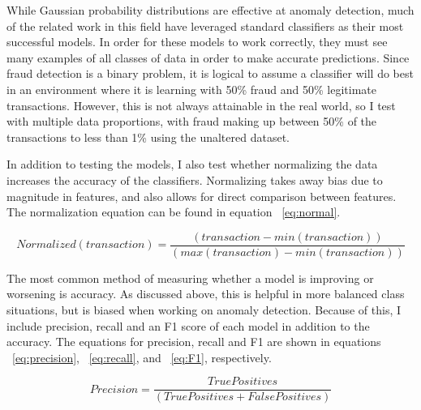 \documentclass[midd]{thesis}
\begin{document}

 While Gaussian probability distributions are effective at anomaly detection, much of the related work in this field have leveraged standard classifiers as their most successful models. In order for these models to work correctly, they must see many examples of all classes of data in order to make accurate predictions. Since fraud detection is a binary problem, it is logical to assume a classifier will do best in an environment where it is learning with 50\% fraud and 50\% legitimate transactions. However, this is not always attainable in the real world, so I test with multiple data proportions, with fraud making up between 50\% of the transactions to less than 1\% using the unaltered dataset. 
 
In addition to testing the models, I also test whether normalizing the data increases the accuracy of the classifiers. Normalizing takes away bias due to magnitude in features, and also allows for direct comparison between features. The normalization equation can be found in equation ~\ref{eq:normal}. 


\begin{equation}
\label{eq:normal}
Normalized(transaction) = \frac{( transaction - min(transaction))}{  (max(transaction) - min(transaction))}
\end{equation}

The most common method of measuring whether a model is improving or worsening is accuracy. As discussed above, this is helpful in more balanced class situations, but is biased when working on anomaly detection. Because of this, I include precision, recall and an F1 score of each model in addition to the accuracy. The equations for precision, recall and F1 are shown in equations ~\ref{eq:precision}, ~\ref{eq:recall}, and ~\ref{eq:F1}, respectively. 

\begin{equation}
\label{eq:precision}
    Precision = \frac{True Positives} {(True Positives + False Positives)}
\end{equation}
\end{document}
